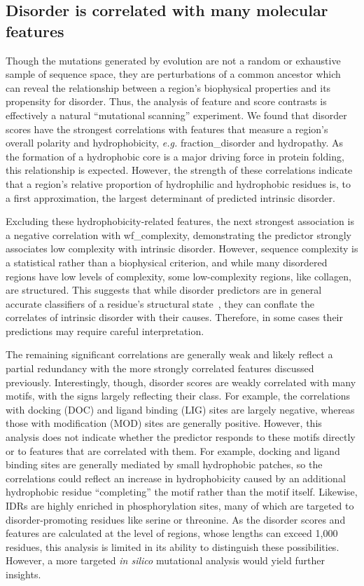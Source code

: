 \subsection{Disorder is correlated with many molecular features}
Though the mutations generated by evolution are not a random or exhaustive sample of sequence space, they are perturbations of a common ancestor which can reveal the relationship between a region's biophysical properties and its propensity for disorder. Thus, the analysis of feature and score contrasts is effectively a natural ``mutational scanning'' experiment. We found that disorder scores have the strongest correlations with features that measure a region's overall polarity and hydrophobicity, \textit{e.g.} fraction\_disorder and hydropathy. As the formation of a hydrophobic core is a major driving force in protein folding, this relationship is expected. However, the strength of these correlations indicate that a region's relative proportion of hydrophilic and hydrophobic residues is, to a first approximation, the largest determinant of predicted intrinsic disorder.

Excluding these hydrophobicity-related features, the next strongest association is a negative correlation with wf\_complexity, demonstrating the predictor strongly associates low complexity with intrinsic disorder. However, sequence complexity is a statistical rather than a biophysical criterion, and while many disordered regions have low levels of complexity, some low-complexity regions, like collagen, are structured. This suggests that while disorder predictors are in general accurate classifiers of a residue's structural state~\cite{Necci2021}, they can conflate the correlates of intrinsic disorder with their causes. Therefore, in some cases their predictions may require careful interpretation.

The remaining significant correlations are generally weak and likely reflect a partial redundancy with the more strongly correlated features discussed previously. Interestingly, though, disorder scores are weakly correlated with many motifs, with the signs largely reflecting their class. For example, the correlations with docking (DOC) and ligand binding (LIG) sites are largely negative, whereas those with modification (MOD) sites are generally positive. However, this analysis does not indicate whether the predictor responds to these motifs directly or to features that are correlated with them. For example, docking and ligand binding sites are generally mediated by small hydrophobic patches, so the correlations could reflect an increase in hydrophobicity caused by an additional hydrophobic residue ``completing'' the motif rather than the motif itself. Likewise, IDRs are highly enriched in phosphorylation sites, many of which are targeted to disorder-promoting residues like serine or threonine. As the disorder scores and features are calculated at the level of regions, whose lengths can exceed 1,000 residues, this analysis is limited in its ability to distinguish these possibilities. However, a more targeted \textit{in silico} mutational analysis would yield further insights.

